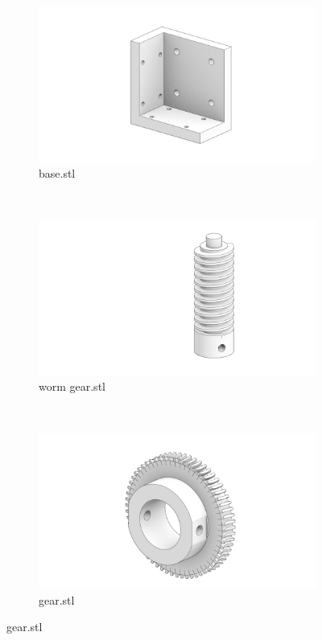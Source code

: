 \documentclass[a4paper]{article}
\begin{document}
\vspace{0.5cm}

\begin{figure}
        \centering
        \begin{subfigure}[b]{0.3\textwidth}
                \includegraphics[width=\textwidth]{figures/base.png}
                \caption*{base.stl }
        \end{subfigure}
        ~ 
        \begin{subfigure}[b]{0.3\textwidth}
                \includegraphics[width=\textwidth]{figures/worm_gear.png}
                \caption*{worm gear.stl }
        \end{subfigure}
        ~ 
        \begin{subfigure}[b]{0.3\textwidth}
                \includegraphics[width=\textwidth]{figures/gear.png}
                \caption*{gear.stl }
        \end{subfigure}
\end{figure}
\end{document}
